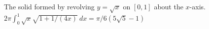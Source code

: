 {The solid formed by revolving $y=\sqrt{x}$ on $[0,1]$ about the $x$-axis.}
{$2\pi\int_0^1 \sqrt{x}\sqrt{1+1/(4x)}\ dx = \pi/6(5\sqrt{5}-1)$}
